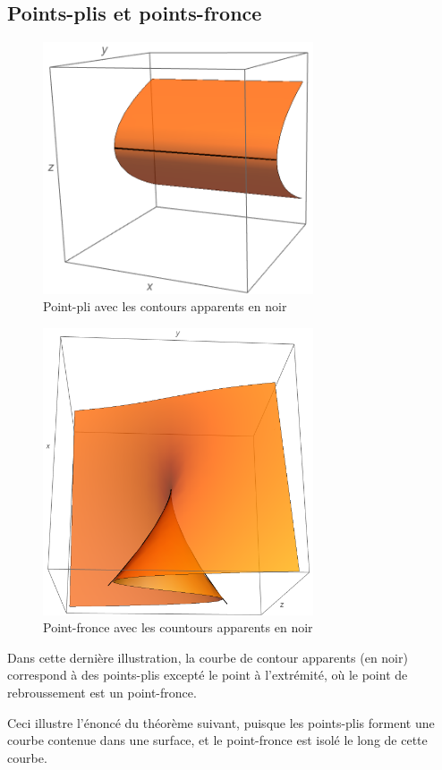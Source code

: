 \documentclass[a4paper]{article}
\theoremstyle{definition}
\begin{document}
\subsection{Points-plis et points-fronce}
\begin{figure}[H]\centering\includegraphics[width=8cm, keepaspectratio]{images/fold_front.png}\caption{Point-pli avec les contours apparents en noir}\end{figure}
\begin{figure}[H]\centering\includegraphics[width=8cm, keepaspectratio]{images/cusp_side.png}\caption{Point-fronce avec les countours apparents en noir}\end{figure}

Dans cette dernière illustration, la courbe de contour apparents (en noir) correspond à des points-plis excepté le point à l'extrémité, où le point de rebroussement est un point-fronce.

Ceci illustre l'énoncé du théorème suivant, puisque les points-plis forment une courbe contenue dans une surface, et le point-fronce est isolé le long de cette courbe.
\end{document}

